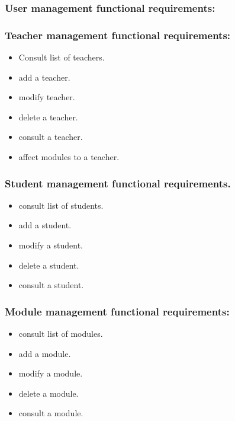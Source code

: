 \documentclass[a4paper,12p]{article}
\begin{document}
     \subsubsection{User management functional requirements:}
     \begin{itemize}

        \subsubsection{Teacher management functional requirements:}
         \begin{itemize}
             \item Consult list of teachers.
             \item add a teacher.
             \item modify teacher.
             \item delete a teacher.
             \item consult a teacher.
             \item affect modules to a teacher.
         \end{itemize}

         \subsubsection{Student management functional requirements.}
         \begin{itemize}
             \item consult list of students.
             \item add a student.
             \item modify a student.
             \item delete a student.
             \item consult a student.
         \end{itemize}

     \end{itemize}

     \subsubsection{Module management functional requirements:}
     \begin{itemize}
        \item consult list of modules.
        \item add a module.
        \item modify a module.
        \item delete a module.
        \item consult a module.
     \end{itemize}
\end{document}
